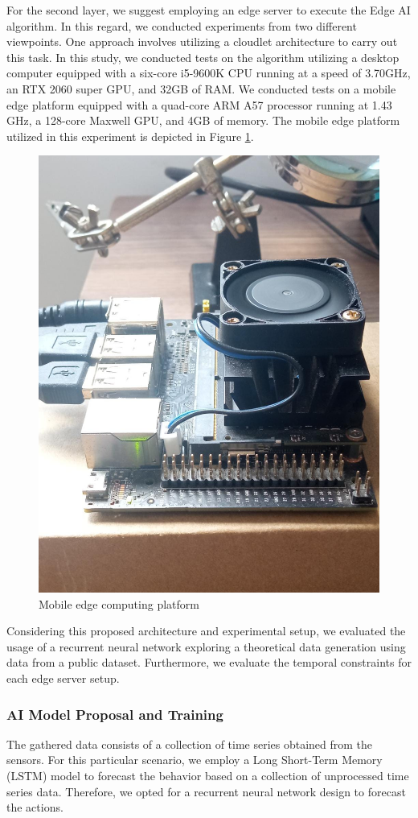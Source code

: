 For the second layer, we suggest employing an edge server to execute the Edge AI algorithm. In this regard, we conducted experiments from two different viewpoints. One approach involves utilizing a cloudlet architecture to carry out this task. In this study, we conducted tests on the algorithm utilizing a desktop computer equipped with a six-core i5-9600K CPU running at a speed of 3.70GHz, an RTX 2060 super GPU, and 32GB of RAM. We conducted tests on a mobile edge platform equipped with a quad-core ARM A57 processor running at 1.43 GHz, a 128-core Maxwell GPU, and 4GB of memory. The mobile edge platform utilized in this experiment is depicted in Figure \ref{fig:jetson}.

\begin{figure}[h!]
    \centering
    \includegraphics[width = .4\linewidth]{Figures/jetson.jpeg}
    \caption{Mobile edge computing platform}
    \label{fig:jetson}
\end{figure}

Considering this proposed architecture and experimental setup, we evaluated the usage of a recurrent neural network exploring a theoretical data generation using data from a public dataset. Furthermore, we evaluate the temporal constraints for each edge server setup.

\subsubsection{AI Model Proposal and Training}

The gathered data consists of a collection of time series obtained from the sensors. For this particular scenario, we employ a Long Short-Term Memory (LSTM) model to forecast the behavior based on a collection of unprocessed time series data. Therefore, we opted for a recurrent neural network design to forecast the actions.

